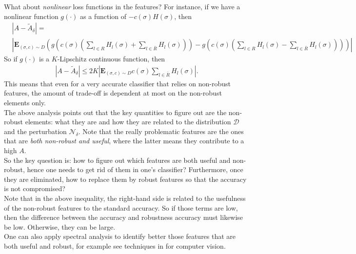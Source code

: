\documentclass[onecolumn,prx, superscriptaddress,longbibliography,margin=1mm 11pt]{revtex4-2}
\begin{document}
     What about \textit{nonlinear} loss functions in the features? For instance, if we have a nonlinear function $g(\cdot)$ as a function of $-c(\sigma)H(\sigma)$, then
     \begin{align}
         & |A-\tilde{A}_{\delta}|= \nonumber \\
         &|\textbf{E}_{(\sigma,c)\sim D}(g(c(\sigma)(\sum_{l \in R}H_l(\sigma)+\sum_{l \in \bar{R}}H_l(\sigma)))-g(c(\sigma)(\sum_{l \in R}H_l(\sigma)-\sum_{l \in \bar{R}}H_l(\sigma))))|
     \end{align}
     So if $g(\cdot)$ is a $K$-Lipschitz continuous function, then 
     \begin{align}
         |A-\tilde{A}_{\delta}|\leq 2K|\textbf{E}_{(\sigma,c)\sim D} c(\sigma)\sum_{l \in \bar{R}} H_l(\sigma)|.
     \end{align}
     This means that even for a very accurate classifier that relies on non-robust features, the amount of trade-off is dependent at most on the non-robust elements only. \\

     
     The above analysis points out that the key quantities to figure out are the non-robust elements: what they are and how they are related to the distribution $\mathcal{D}$ and the perturbation $\mathcal{N}_{\delta}$. Note that the really problematic features are the ones that are \textit{both non-robust and useful}, where the latter means they contribute to a high $A$. \\
     
     So the key question is: how to figure out which features are both useful and non-robust, hence one needs to get rid of them in one's classifier? Furthermore, once they are eliminated, how to replace them by robust features so that the accuracy is not compromised? \\
     
     Note that in the above inequality, the right-hand side is related to the usefulness of the non-robust features to the standard accuracy. So if those terms are low, then the difference between the accuracy and robustness accuracy must likewise be low. Otherwise, they can be large. \\

      One can also apply spectral analysis to identify better those features that are both useful and robust, for example see techniques in \cite{yin2019fourier} for computer vision. 
  
\end{document}
